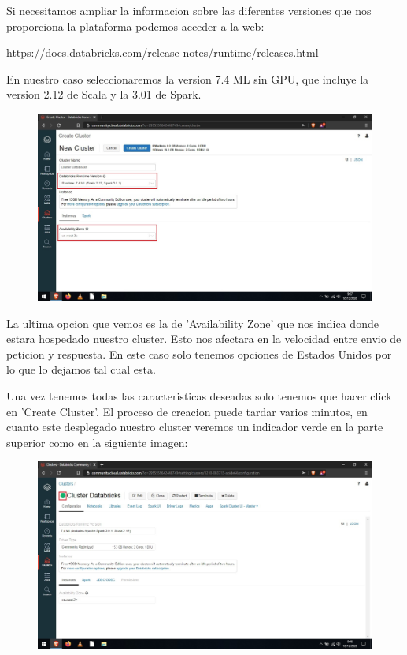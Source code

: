 \documentclass[a4paper,10pt]{article}
\begin{document}
Si necesitamos ampliar la informacion sobre las diferentes versiones que nos proporciona la plataforma podemos acceder a la web:

\href{https://docs.databricks.com/release-notes/runtime/releases.html}{https://docs.databricks.com/release-notes/runtime/releases.html}

En nuestro caso seleccionaremos la version 7.4 ML sin GPU, que incluye la version 2.12 de Scala y la 3.01 de Spark. 

\begin{figure}[H]
\begin{center}
\includegraphics[width=500pt]{./fotos/Databricks/8 - Databricks (V).jpg}
\end{center}
\end{figure}

La ultima opcion que vemos es la de 'Availability Zone' que nos indica donde estara hospedado nuestro cluster. Esto nos afectara en la velocidad entre envio de peticion y respuesta. En este caso solo tenemos opciones de Estados Unidos por lo que lo dejamos tal cual esta.

Una vez tenemos todas las caracteristicas deseadas solo tenemos que hacer click en 'Create Cluster'. El proceso de creacion puede tardar varios minutos, en cuanto este desplegado nuestro cluster veremos un indicador verde en la parte superior como en la siguiente imagen:

\begin{figure}[H]
\begin{center}
\includegraphics[width=500pt]{./fotos/Databricks/9 - Databricks (V).jpg}
\end{center}
\end{figure}
\end{document}
